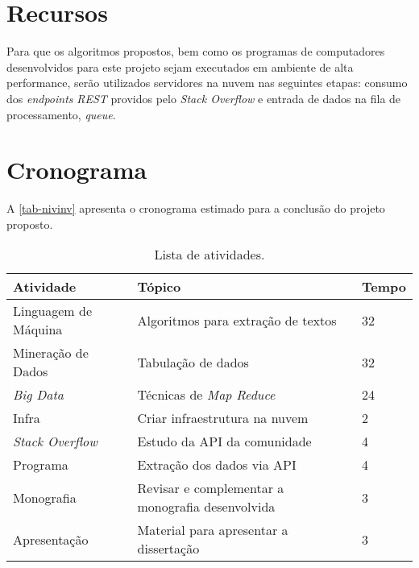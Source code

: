 \chapter{Recursos}
Para que os algoritmos propostos, bem como os programas de computadores desenvolvidos para este projeto sejam executados em ambiente de alta performance, serão utilizados servidores na nuvem nas seguintes etapas: consumo dos \textit{endpoints} \emph{REST} providos pelo \textit{Stack Overflow} e entrada de dados na fila de processamento, \textit{queue}.

\chapter{Cronograma}

A \autoref{tab-nivinv} apresenta o cronograma estimado para a conclusão do projeto proposto.

\begin{table}[htb]
\ABNTEXfontereduzida
\caption[Cronograma]{Lista de atividades.}
\label{tab-nivinv}
\begin{tabular}{p{3.75cm}|p{9.0cm}|p{1.5cm}}
   \textbf{Atividade} & \textbf{Tópico}  & \textbf{Tempo}  \\
    \hline
   		 Linguagem de Máquina & Algoritmos para extração de textos & 32 \\
    \hline
    	Mineração de Dados & Tabulação de dados & 32  \\
    \hline
    	\textit{Big Data} & Técnicas de \textit{Map Reduce} & 24  \\
	\hline
   		 Infra & Criar infraestrutura na nuvem & 2  \\
    \hline
    	\textit{Stack Overflow} & Estudo da API da comunidade & 4  \\
    \hline
    	Programa & Extração dos dados via API & 4  \\    
    \hline
    Monografia & Revisar e complementar a monografia desenvolvida & 3  \\    
     \hline
    Apresentação & Material para apresentar a dissertação & 3  \\        
\end{tabular}
\end{table}





